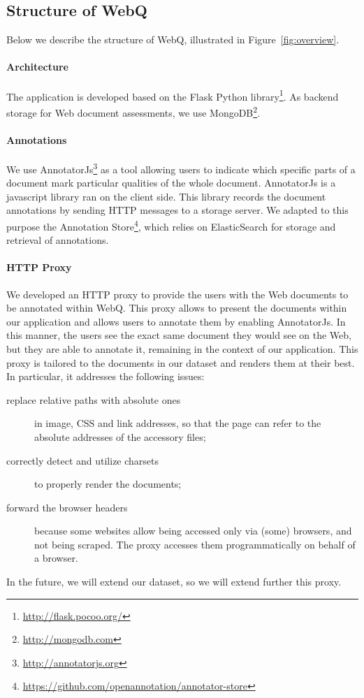 \documentclass{llncs}
\begin{document}
\subsection{Structure of WebQ}

Below we describe the structure of WebQ, illustrated in Figure~\ref{fig:overview}.
\paragraph{Architecture}
The application is developed based on the Flask Python library\footnote{\url{http://flask.pocoo.org/}}.
As backend storage for Web document assessments, we use MongoDB\footnote{\url{http://mongodb.com}}.
\paragraph{Annotations}
We use AnnotatorJs\footnote{\url{http://annotatorjs.org}} as a tool allowing users to indicate which specific parts of a document mark particular qualities of the whole document.
AnnotatorJs is a javascript library ran on the client side. This library records the document annotations by sending HTTP messages to a storage server. We adapted to this purpose the Annotation Store\footnote{\url{https://github.com/openannotation/annotator-store}}, which relies on ElasticSearch for storage and retrieval of annotations.
\paragraph{HTTP Proxy}
We developed an HTTP proxy to provide the users with the Web documents to be annotated within WebQ. This proxy allows to present the documents within our application and allows users to annotate them by enabling AnnotatorJs. In this manner, the users see the exact same document they would see on the Web, but they are able to annotate it, remaining in the context of our application.
This proxy is tailored to the documents in our dataset and renders them at their best. In particular, it addresses the following issues:
\begin{description}
\item[replace relative paths with absolute ones] in image, CSS and link addresses, so that the page can refer to the absolute addresses of the accessory files;
\item[correctly detect and utilize charsets] to properly render the documents;
\item [forward the browser headers] because some websites allow being accessed only via (some) browsers, and not being scraped. The proxy accesses them programmatically on behalf of a browser.%
\end{description}
In the future, we will extend our dataset, so we will extend further this proxy.
\end{document}
